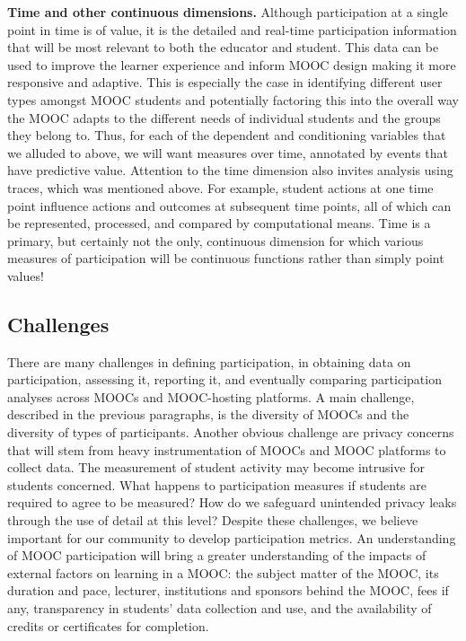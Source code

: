 \textbf{Time and other continuous dimensions.}  Although participation
at a single point in time is of value, it is the detailed and real-time
participation information that will be most relevant to both the
educator and student. This data can be used to improve the learner
experience and inform MOOC design making it more responsive and
adaptive. This is especially the case in identifying different user
types amongst MOOC students and potentially factoring this into the
overall way the MOOC adapts to the different needs of individual
students and the groups they belong to. Thus, for each of the dependent
and conditioning variables that we alluded to above, we will want
measures over time, annotated by events that have predictive value.
Attention to the time dimension also invites analysis using traces,
which was mentioned above. For example, student actions at one time
point influence actions and outcomes at subsequent time points, all of
which can be represented, processed, and compared by computational
means.  Time is a primary, but certainly not the only, continuous
dimension for which various measures of participation will be continuous
functions rather than simply point values!

\subsection{Challenges}

 There are many challenges in defining participation, in
obtaining data on participation, assessing it, reporting it, and
eventually comparing participation analyses across MOOCs and
MOOC-hosting platforms. A main challenge, described in the previous
paragraphs, is the diversity of MOOCs and the diversity of types of
participants. Another obvious challenge are privacy concerns that will
stem from heavy instrumentation of MOOCs and MOOC platforms to collect
data. The measurement of student activity may become intrusive for
students concerned. What happens to participation measures if students
are required to agree to be measured? How do we safeguard unintended
privacy leaks through the use of detail at this level?  Despite these
challenges, we believe important for our community to develop
participation metrics. An understanding of MOOC participation will bring
a greater understanding of the impacts of external factors on learning
in a MOOC: the subject matter of the MOOC, its duration and pace,
lecturer, institutions and sponsors behind the MOOC, fees if any,
transparency in students' data collection and use, and the availability
of credits or certificates for completion.

